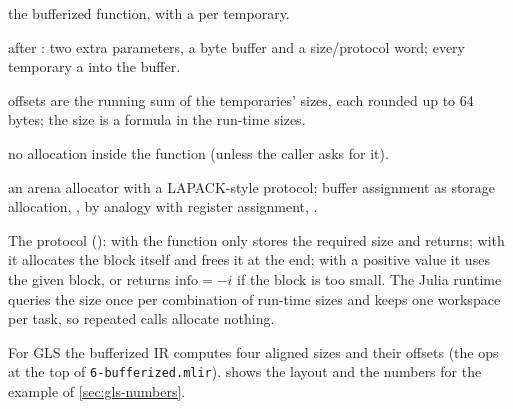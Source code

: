 \begin{steps}
\item[Input] the bufferized function, with a  per temporary.
\item[Representation] after : two extra parameters, a byte buffer and a size/protocol word; every temporary a  into the buffer.
\item[Rule] offsets are the running sum of the temporaries' sizes, each rounded up to 64 bytes; the size is a formula in the run-time sizes.
\item[Output] no allocation inside the function (unless the caller asks for it).
\item[Theory] an arena allocator with a LAPACK-style  protocol; buffer assignment as storage allocation, , by analogy with register assignment, .
\end{steps}

The protocol (): with
 the function only stores the required size and
returns; with  it allocates the block itself and frees it at the end;
with a positive value it uses the given block, or returns
\(\mathrm{info} = -i\) if the block is too small. The Julia runtime queries
the size once per combination of run-time sizes and keeps one workspace per
task, so repeated calls allocate nothing.

For GLS the bufferized IR computes four aligned sizes and their offsets
(the  ops at the top of \texttt{6-bufferized.mlir}).
 shows the layout and the numbers for the example of
\cref{sec:gls-numbers}.

